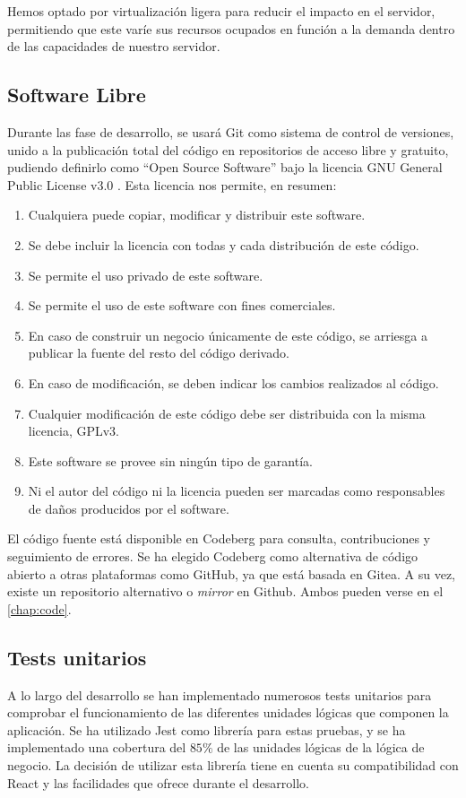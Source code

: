 Hemos optado por virtualización ligera para reducir el impacto en el servidor, permitiendo que este varíe sus recursos ocupados en función a la demanda dentro de las capacidades de nuestro servidor.


\subsection{Software Libre}
\label{tec_hab:foss}

Durante las fase de desarrollo, se usará Git como sistema de control de versiones, unido a la publicación total del código en repositorios de acceso libre y gratuito, pudiendo definirlo como ``Open Source Software'' bajo la licencia GNU General Public License v3.0 \cite{GPLv3}. Esta licencia nos permite, en resumen:

\begin{enumerate}
	\item Cualquiera puede copiar, modificar y distribuir este software.
	\item Se debe incluir la licencia con todas y cada distribución de este código.
	\item Se permite el uso privado de este software.
	\item Se permite el uso de este software con fines comerciales.
	\item En caso de construir un negocio únicamente de este código, se arriesga a publicar la fuente del resto del código derivado.
	\item En caso de modificación, se deben indicar los cambios realizados al código.
	\item Cualquier modificación de este código debe ser distribuida con la misma licencia, GPLv3.
	\item Este software se provee sin ningún tipo de garantía.
	\item Ni el autor del código ni la licencia pueden ser marcadas como responsables de daños producidos por el software.
\end{enumerate}

El código fuente está disponible en Codeberg para consulta, contribuciones y seguimiento de errores. Se ha elegido Codeberg como alternativa de código abierto a otras plataformas como GitHub, ya que está basada en Gitea. A su vez, existe un repositorio alternativo o \textit{mirror} en Github. Ambos pueden verse en el \autoref{chap:code}.


\subsection{Tests unitarios}
\label{tec_hab:tests}


A lo largo del desarrollo se han implementado numerosos tests unitarios para comprobar el funcionamiento de las diferentes unidades lógicas que componen la aplicación. Se ha utilizado Jest como librería para estas pruebas, y se ha implementado una cobertura del $85\%$ de las unidades lógicas de la lógica de negocio. La decisión de utilizar esta librería tiene en cuenta su compatibilidad con React y las facilidades que ofrece durante el desarrollo.
